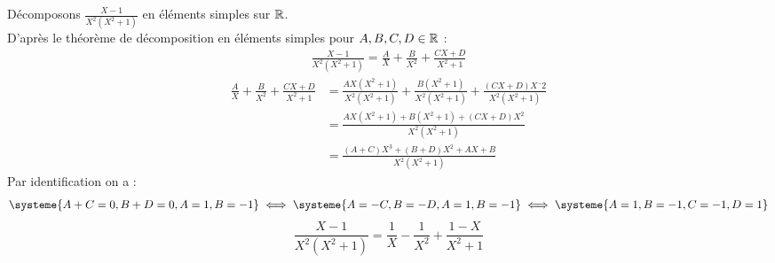 \begin{example}
	Décomposons $\frac{X - 1}{X^2(X^2 + 1)}$ en éléments simples sur $\mathbb{R}$.
	\\ 
	D'après le théorème de décomposition en éléments simples pour $A, B, C, D \in \mathbb{R}$ :
	\begin{align*}
		\frac{X - 1}{X^2(X^2 + 1)} = \frac{A}{X} + \frac{B}{X^2} + \frac{CX + D}{X^2 + 1}
	\end{align*}
	\begin{align*}
		\frac{A}{X} + \frac{B}{X^2} + \frac{CX + D}{X^2 + 1} &= \frac{AX(X^2 + 1)}{X^2(X^2 + 1)} + \frac{B(X^2 + 1)}{X^2(X^2 + 1)} + \frac{(CX + D) X¨2}{X^2(X^2 + 1)} \\
		&= \frac{AX(X^2 + 1) + B(X^2 + 1) + (CX + D)X^2}{X^2(X^2 + 1)} \\
		&= \frac{(A + C)X^3 + (B + D)X^2 + AX + B}{X^2(X^2 + 1)}
	\end{align*}
	Par identification on a :
	\begin{align*}
		\systeme{
			A + C = 0,
			B + D = 0,
			A = 1,
			B = -1
		}
		\iff 
		\systeme{
			A = -C,
			B = -D,
			A = 1,
			B = -1
		}
		\iff
		\systeme{
			A = 1,
			B = -1,
			C = -1,
			D = 1
		}
	\end{align*}
	\[  
	\frac{X - 1}{X^2(X^2 + 1)} = \frac{1}{X} - \frac{1}{X^2} + \frac{1 - X}{X^2 + 1}
	\]
\end{example}
